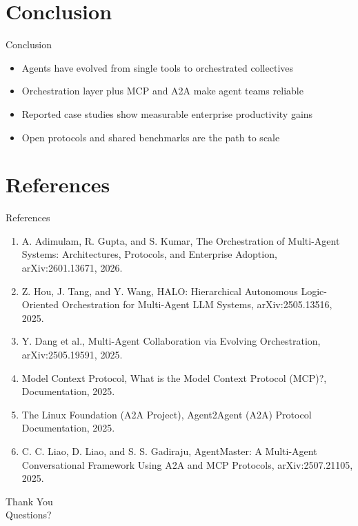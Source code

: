 \documentclass[10pt]{beamer}
\begin{document}
\section{Conclusion}
\begin{frame}{Conclusion}
\begin{itemize}
  \item Agents have evolved from single tools to orchestrated collectives
  \item Orchestration layer plus MCP and A2A make agent teams reliable
  \item Reported case studies show measurable enterprise productivity gains
  \item Open protocols and shared benchmarks are the path to scale
\end{itemize}
\end{frame}

\section{References}
\begin{frame}[allowframebreaks]{References}
  \footnotesize
  \begin{enumerate}
    \item A. Adimulam, R. Gupta, and S. Kumar, The Orchestration of Multi-Agent Systems: Architectures, Protocols, and Enterprise Adoption, arXiv:2601.13671, 2026.
    \item Z. Hou, J. Tang, and Y. Wang, HALO: Hierarchical Autonomous Logic-Oriented Orchestration for Multi-Agent LLM Systems, arXiv:2505.13516, 2025.
    \item Y. Dang et al., Multi-Agent Collaboration via Evolving Orchestration, arXiv:2505.19591, 2025.
    \item Model Context Protocol, What is the Model Context Protocol (MCP)?, Documentation, 2025.
    \item The Linux Foundation (A2A Project), Agent2Agent (A2A) Protocol Documentation, 2025.
    \item C. C. Liao, D. Liao, and S. S. Gadiraju, AgentMaster: A Multi-Agent Conversational Framework Using A2A and MCP Protocols, arXiv:2507.21105, 2025.
  \end{enumerate}
\end{frame}

\begin{frame}[plain]
  \begin{center}
    {\Huge Thank You}\\[1em]
    {\large Questions?}
  \end{center}
\end{frame}
\end{document}
